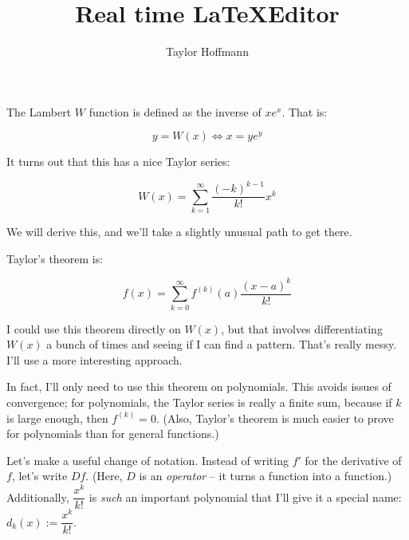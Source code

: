 \documentclass[a4paper,12pt]{article}
\author{Taylor Hoffmann}
\title{Real time \LaTeX \space Editor}
\begin{document}
\maketitle

The Lambert $W$ function is defined as the inverse of $xe^x$. That is:

$$y=W(x)\iff x=ye^y$$

It turns out that this has a nice Taylor series:

$$W(x)=\sum_{k=1}^\infty\frac{(-k)^{k-1}}{k!}x^k$$

We will derive this, and we'll take a slightly unusual path to get there.

Taylor's theorem is:

$$f(x)=\sum_{k=0}^\infty f^{(k)}(a)\frac{(x-a)^k}{k!}$$

I could use this theorem directly on $W(x)$, but that involves differentiating $W(x)$ a bunch of times and seeing if I can find a pattern. That's really messy. I'll use a more interesting approach.

In fact, I'll only need to use this theorem on polynomials. This avoids issues of convergence; for polynomials, the Taylor series is really a finite sum, because if $k$ is large enough, then $f^{(k)}=0$. (Also, Taylor's theorem is much easier to prove for polynomials than for general functions.)

Let's make a useful change of notation. Instead of writing $f'$ for the derivative of $f$, let's write $Df$. (Here, $D$ is an \textit{operator} -- it turns a function into a function.) Additionally, $\dfrac{x^k}{k!}$ is \textit{such} an important polynomial that I'll give it a special name: $d_k(x):=\dfrac{x^k}{k!}$.
\end{document}

